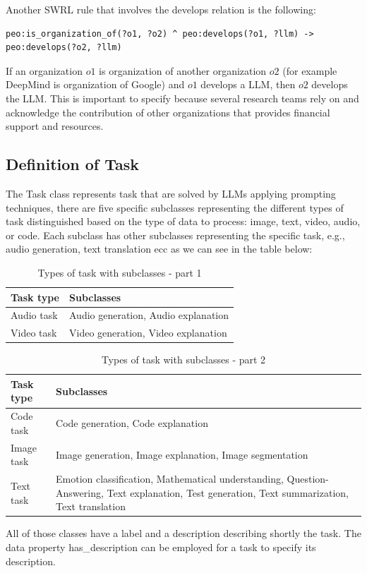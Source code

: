 Another SWRL rule that involves the develops relation is the following:
\begin{lstlisting}
peo:is_organization_of(?o1, ?o2) ^ peo:develops(?o1, ?llm) -> peo:develops(?o2, ?llm)
\end{lstlisting}
If an organization $o1$ is organization of another organization $o2$ (for example DeepMind is organization of Google) and $o1$ develops a LLM, then $o2$ develops the LLM.
This is important to specify because several research teams rely on and acknowledge the contribution of other organizations that provides financial support and resources.

\subsection{Definition of Task}
\label{subsection:4_3_4_task}
The Task class represents task that are solved by LLMs applying prompting techniques, there are five specific subclasses representing the different types of task distinguished based on the type of data to process: image, text, video, audio, or code.
Each subclass has other subclasses representing the specific task, e.g., audio generation, text translation ecc as we can see in the table below:
\begin{table}[H]
    \footnotesize 
    \centering
    \begin{tabular}{|>{\raggedright\arraybackslash}p{6cm}|>{\raggedright\arraybackslash}p{6cm}|}
        \hline
        Task type & Subclasses \\ \hline
        Audio task & Audio generation, Audio explanation \\ \hline

        Video task & Video generation, Video explanation \\ \hline
    \end{tabular}
    \caption{Types of task with subclasses - part 1}
\end{table}

\begin{table}[H]
    \footnotesize 
    \centering
    \begin{tabular}{|>{\raggedright\arraybackslash}p{6cm}|>{\raggedright\arraybackslash}p{6cm}|}
        \hline
        Task type & Subclasses \\ \hline
        Code task & Code generation, Code explanation \\ \hline

        Image task & Image generation, Image explanation, Image segmentation \\ \hline

        Text task & Emotion classification, Mathematical understanding, Question-Answering, Text explanation, Test generation, Text summarization, Text translation \\ \hline
    \end{tabular}
    \caption{Types of task with subclasses - part 2}
\end{table}
All of those classes have a label and a description describing shortly the task.
The data property has\_description can be employed for a task to specify its description.

